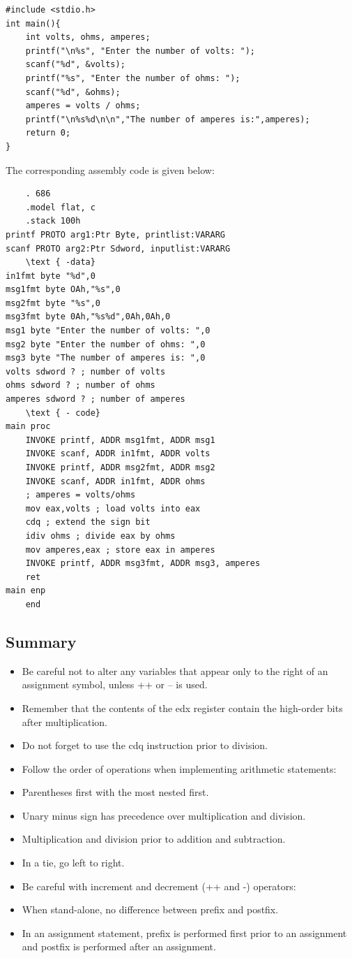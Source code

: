 \documentclass[10pt]{article}
\begin{document}
\begin{verbatim}
#include <stdio.h>
int main(){
    int volts, ohms, amperes;
    printf("\n%s", "Enter the number of volts: ");
    scanf("%d", &volts);
    printf("%s", "Enter the number of ohms: ");
    scanf("%d", &ohms);
    amperes = volts / ohms;
    printf("\n%s%d\n\n","The number of amperes is:",amperes);
    return 0;
}
\end{verbatim}

The corresponding assembly code is given below:

\begin{verbatim}
    . 686
    .model flat, c
    .stack 100h
printf PROTO arg1:Ptr Byte, printlist:VARARG
scanf PROTO arg2:Ptr Sdword, inputlist:VARARG
    \text { -data}
in1fmt byte "%d",0
msg1fmt byte OAh,"%s",0
msg2fmt byte "%s",0
msg3fmt byte 0Ah,"%s%d",0Ah,0Ah,0
msg1 byte "Enter the number of volts: ",0
msg2 byte "Enter the number of ohms: ",0
msg3 byte "The number of amperes is: ",0
volts sdword ? ; number of volts
ohms sdword ? ; number of ohms
amperes sdword ? ; number of amperes
    \text { - code}
main proc
    INVOKE printf, ADDR msg1fmt, ADDR msg1
    INVOKE scanf, ADDR in1fmt, ADDR volts
    INVOKE printf, ADDR msg2fmt, ADDR msg2
    INVOKE scanf, ADDR in1fmt, ADDR ohms
    ; amperes = volts/ohms
    mov eax,volts ; load volts into eax
    cdq ; extend the sign bit
    idiv ohms ; divide eax by ohms
    mov amperes,eax ; store eax in amperes
    INVOKE printf, ADDR msg3fmt, ADDR msg3, amperes
    ret
main enp
    end
\end{verbatim}

\subsection*{Summary}
\begin{itemize}
  \item Be careful not to alter any variables that appear only to the right of an assignment symbol, unless ++ or -- is used.
  \item Remember that the contents of the edx register contain the high-order bits after multiplication.
  \item Do not forget to use the cdq instruction prior to division.
  \item Follow the order of operations when implementing arithmetic statements:
  \item Parentheses first with the most nested first.
  \item Unary minus sign has precedence over multiplication and division.
  \item Multiplication and division prior to addition and subtraction.
  \item In a tie, go left to right.
  \item Be careful with increment and decrement (++ and -) operators:
  \item When stand-alone, no difference between prefix and postfix.
  \item In an assignment statement, prefix is performed first prior to an assignment and postfix is performed after an assignment.
\end{itemize}
\end{document}
